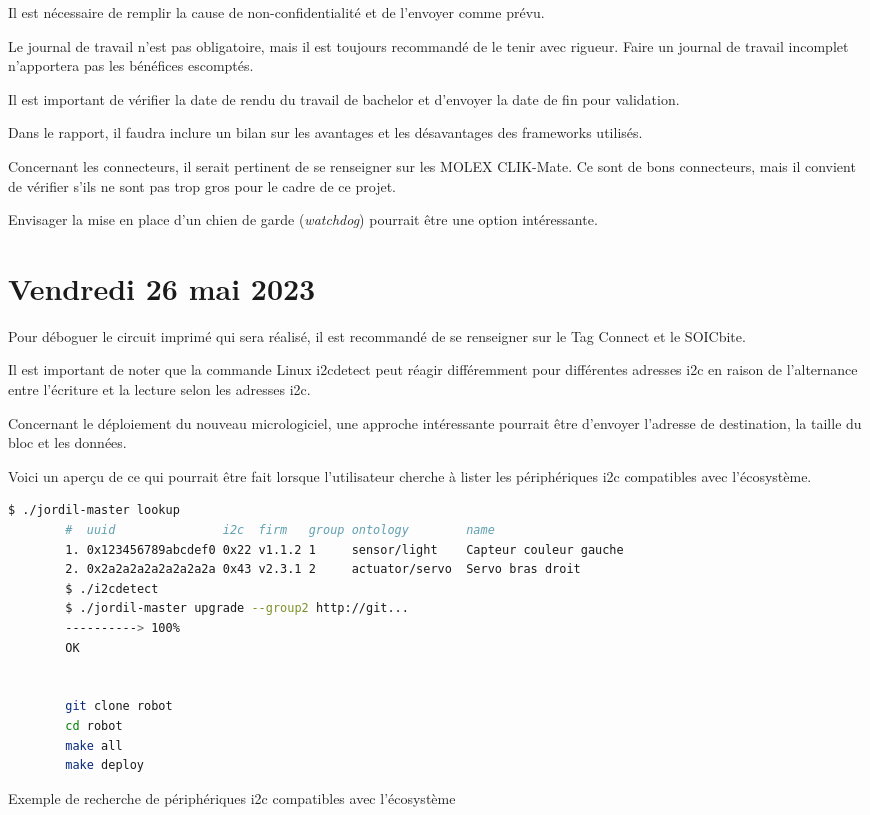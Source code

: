 Il est nécessaire de remplir la cause de non-confidentialité et de l'envoyer comme prévu.

Le journal de travail n'est pas obligatoire, mais il est toujours recommandé de le tenir avec rigueur. Faire un journal de travail incomplet n'apportera pas les bénéfices escomptés.

Il est important de vérifier la date de rendu du travail de bachelor et d'envoyer la date de fin pour validation.

Dans le rapport, il faudra inclure un bilan sur les avantages et les désavantages des \gls{framework}s utilisés.

Concernant les connecteurs, il serait pertinent de se renseigner sur les MOLEX CLIK-Mate. Ce sont de bons connecteurs, mais il convient de vérifier s'ils ne sont pas trop gros pour le cadre de ce projet.

Envisager la mise en place d'un chien de garde (\textit{watchdog}) pourrait être une option intéressante.

\section{Vendredi 26 mai 2023}

Pour déboguer le circuit imprimé qui sera réalisé, il est recommandé de se renseigner sur le Tag Connect et le SOICbite.

Il est important de noter que la commande Linux i2cdetect peut réagir différemment pour différentes adresses \gls{i2c} en raison de l'alternance entre l'écriture et la lecture selon les adresses \gls{i2c}.

Concernant le déploiement du nouveau micrologiciel, une approche intéressante pourrait être d'envoyer l'adresse de destination, la taille du bloc et les données.

Voici un aperçu de ce qui pourrait être fait lorsque l'utilisateur cherche à lister les périphériques \gls{i2c} compatibles avec l'écosystème.

\begin{listing}[!h]
    \begin{lstlisting}[language=bash]
        $ ./jordil-master lookup
        #  uuid               i2c  firm   group ontology        name
        1. 0x123456789abcdef0 0x22 v1.1.2 1     sensor/light    Capteur couleur gauche
        2. 0x2a2a2a2a2a2a2a2a 0x43 v2.3.1 2     actuator/servo  Servo bras droit
        $ ./i2cdetect
        $ ./jordil-master upgrade --group2 http://git... 
        ----------> 100%
        OK
        
        
        git clone robot
        cd robot
        make all
        make deploy
    \end{lstlisting}
    \caption{Exemple de recherche de périphériques \gls{i2c} compatibles avec l'écosystème}
\end{listing}

